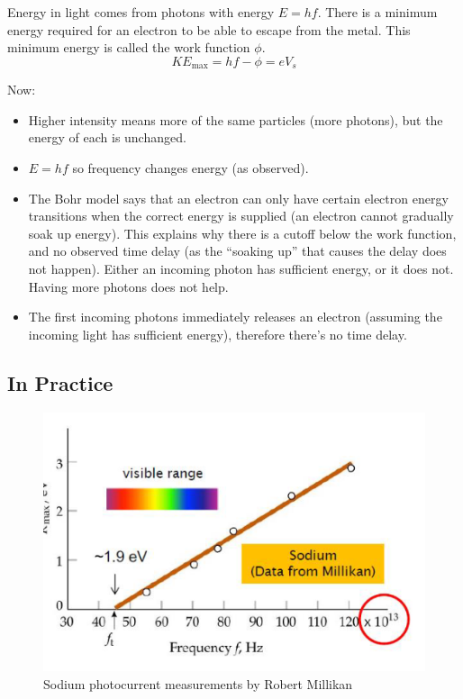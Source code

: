 Energy in light comes from photons with energy $E = hf$. There is a minimum energy required for an electron to be able to escape from the metal. This minimum energy is called the work function $\phi$.
\[
    KE_\text{max} = hf - \phi = eV_s
\]

Now:
\begin{itemize}
    \item Higher intensity means more of the same particles (more photons), but the energy of each is unchanged.
    \item $E = hf$ so frequency changes energy (as observed).
    \item The Bohr model says that an electron can only have certain electron energy transitions when the correct energy is supplied (an electron cannot gradually soak up energy). This explains why there is a cutoff below the work function, and no observed time delay (as the ``soaking up'' that causes the delay does not happen). Either an incoming photon has sufficient energy, or it does not. Having more photons does not help.
    \item The first incoming photons immediately releases an electron (assuming the incoming light has sufficient energy), therefore there's no time delay.
\end{itemize}

\subsection*{In Practice}
\begin{figure}[H]
    \centering
    \includegraphics{figures/lec03-05.png}
     \caption{Sodium photocurrent measurements by Robert Millikan}
\end{figure}


